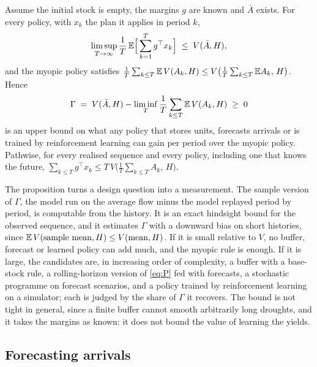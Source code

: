 \begin{proposition}\label{prop:fluid}
Assume the initial stock is empty, the margins $g$ are known and $\bar A$ exists. For every policy, with $x_k$ the
plan it applies in period $k$,
\begin{equation}\label{eq:fluid}
\limsup_{T\to\infty}\frac1T\,\mathbb{E}\Big[\sum_{k=1}^{T}g^\top x_k\Big]\;\le\;V(\bar A,H),
\end{equation}
and the myopic policy satisfies $\frac1T\sum_{k\le T}\mathbb{E}\,V(A_k,H)\le V\big(\frac1T\sum_{k\le T}\mathbb{E} A_k,\,H\big)$.
Hence
\begin{equation}\label{eq:gamma}
\Gamma\;=\;V(\bar A,H)-\liminf_{T}\frac1T\sum_{k\le T}\mathbb{E}\,V(A_k,H)\;\ge\;0
\end{equation}
is an upper bound on what any policy that stores units, forecasts arrivals or is trained by reinforcement learning
can gain per period over the myopic policy. Pathwise, for every realised sequence and every policy, including one
that knows the future, $\sum_{k\le T}g^\top x_k\le T\,V\big(\tfrac1T\sum_{k\le T}A_k,\,H\big)$.
\end{proposition}

The proposition turns a design question into a measurement. The sample version of $\Gamma$, the model run on the
average flow minus the model replayed period by period, is computable from the history. It is an exact hindsight
bound for the observed sequence, and it estimates $\Gamma$ with a downward bias on short histories, since
$\mathbb{E}\,V(\text{sample mean},H)\le V(\text{mean},H)$. If it is small relative to $V$, no buffer, forecast or learned
policy can add much, and the myopic rule is enough. If it is large, the candidates are, in increasing order of
complexity, a buffer with a base-stock rule, a rolling-horizon version of \eqref{eq:P} fed with forecasts, a
stochastic programme on forecast scenarios, and a policy trained by reinforcement learning on a simulator; each is
judged by the share of $\Gamma$ it recovers. The bound is not tight in general, since a finite buffer cannot smooth
arbitrarily long droughts, and it takes the margins as known: it does not bound the value of learning the yields.

\subsection{Forecasting arrivals}\label{sec:forecast}

